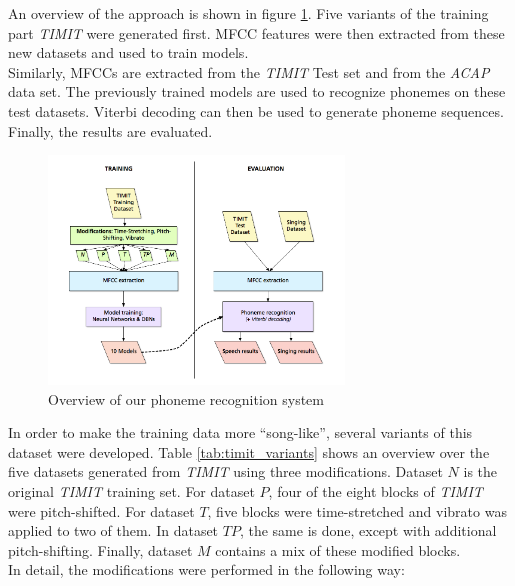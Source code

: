 An overview of the approach is shown in figure \ref{fig:process_songify}. Five variants of the training part  \textit{TIMIT} were generated first. MFCC features were then extracted from these new datasets and used to train models.\\
Similarly, MFCCs are extracted from the \textit{TIMIT} Test set and from the \textit{ACAP} data set. The previously trained models are used to recognize phonemes on these test datasets. Viterbi decoding can then be used to generate phoneme sequences. Finally, the results are evaluated.
\setlength{\belowcaptionskip}{-0.4cm}
\begin{figure}
 \begin{center}
                \includegraphics[width=0.7\textwidth]{images/process_songify.png}
                \caption{Overview of our phoneme recognition system}
                \label{fig:process_songify}
                 \end{center}
 \end{figure}
 \setlength{\belowcaptionskip}{-0.1cm}
In order to make the training data more ``song-like'', several variants of this dataset were developed. Table \ref{tab:timit_variants} shows an overview over the five datasets generated from \textit{TIMIT} using three modifications. Dataset $N$ is the original \textit{TIMIT} training set. For dataset $P$, four of the eight blocks of \textit{TIMIT} were pitch-shifted. For dataset $T$, five blocks were time-stretched and vibrato was applied to two of them. In dataset $TP$, the same is done, except with additional pitch-shifting. Finally, dataset $M$ contains a mix of these modified blocks.\\
In detail, the modifications were performed in the following way:


